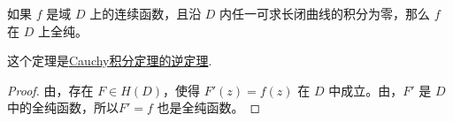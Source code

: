 \documentclass[../../main.tex]{subfiles}
\begin{document}
\begin{theorem}[Morera定理]\label{theorem:Morera(莫雷拉)定理}
如果 \( f \) 是域 \( D \) 上的连续函数，且沿 \( D \) 内任一可求长闭曲线的积分为零，那么 \( f \) 在 \( D \) 上全纯。
\end{theorem}
\begin{note}
这个定理是\hyperref[theorem:Cauchy-Goursat定理(Cauchy积分定理)]{Cauchy积分定理的逆定理}.
\end{note}
\begin{proof}
由，存在 \( F \in H(D) \)，使得 \( F'(z) = f(z) \) 在 \( D \) 中成立。由，\( F' \) 是 \( D \) 中的全纯函数，所以\(F' = f \) 也是全纯函数。
\end{proof}
\end{document}
